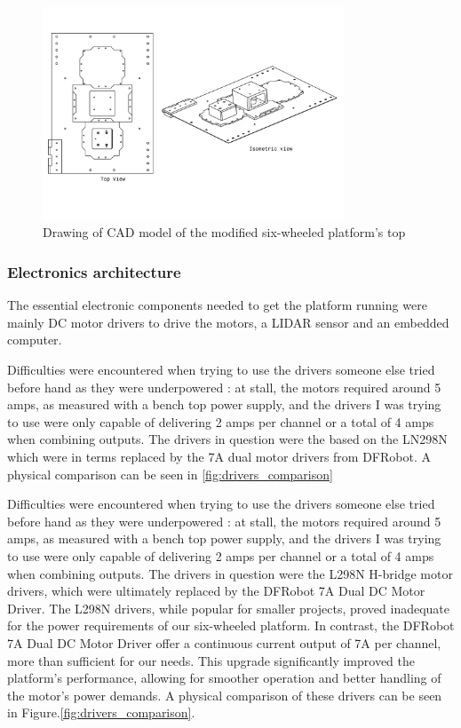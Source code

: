 \documentclass[11pt]{article}
\begin{document}
        \begin{figure}[htbp]
            \centering
            \includegraphics[width=0.8\textwidth]{Images/ViewRoverV1.pdf}
            \caption{Drawing of CAD model of the modified six-wheeled platform's top}
            \label{fig:full_cad_model}
        \end{figure}

        \subsubsection{Electronics architecture}
            The essential electronic components needed to get the platform running were mainly DC motor drivers to drive the motors, a LIDAR sensor and an embedded computer.
            
            Difficulties were encountered when trying to use the drivers someone else tried before hand as they were underpowered : at stall, the motors required around 5 amps, as measured with a bench top power supply, and the drivers I was trying to use were only capable of delivering 2 amps per channel or a total of 4 amps when combining outputs. The drivers in question were the based on the LN298N which were in terms replaced by the 7A dual motor drivers from DFRobot. A physical comparison can be seen in \ref{fig:drivers_comparison}
            
            Difficulties were encountered when trying to use the drivers someone else tried before hand as they were underpowered : at stall, the motors required around 5 amps, as measured with a bench top power supply, and the drivers I was trying to use were only capable of delivering 2 amps per channel or a total of 4 amps when combining outputs. The drivers in question were the L298N H-bridge motor drivers, which were ultimately replaced by the DFRobot 7A Dual DC Motor Driver. The L298N drivers, while popular for smaller projects, proved inadequate for the power requirements of our six-wheeled platform. In contrast, the DFRobot 7A Dual DC Motor Driver offer a continuous current output of 7A per channel, more than sufficient for our needs. This upgrade significantly improved the platform's performance, allowing for smoother operation and better handling of the motor's power demands. A physical comparison of these drivers can be seen in Figure.\ref{fig:drivers_comparison}.
\end{document}
